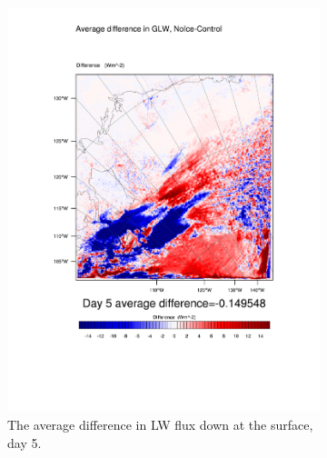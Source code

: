\begin{figure}
	\begin{subfigure}{0.48\textwidth}
		\centering
		\includegraphics[width=\textwidth]{results/noice/diff_NoIce_GLW_Day5.pdf}
		\caption{The average difference in LW flux down at the surface, day 5.}
		\label{subfig:glw_r2Day5}
	\end{subfigure}
	\quad
	\begin{subfigure}{0.48\textwidth}
		\centering

\end{subfigure}
\end{figure}

